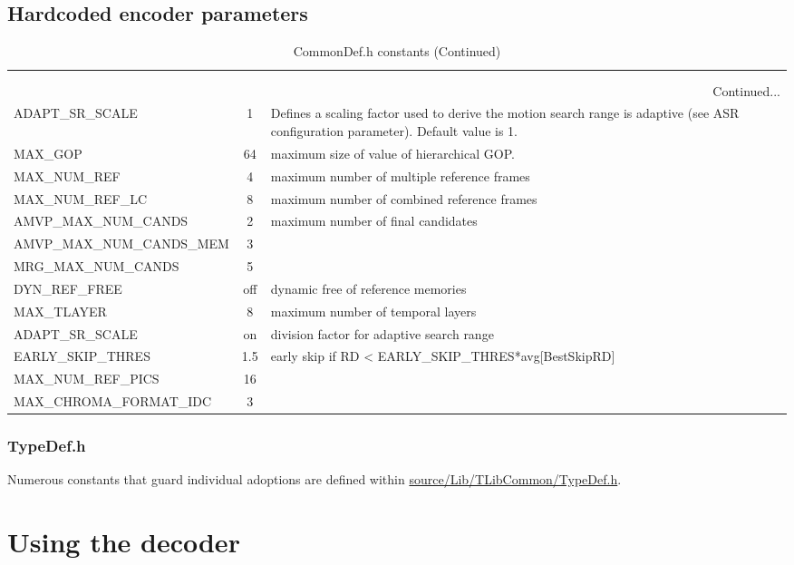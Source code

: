 \documentclass[a4paper,11pt]{jvetdoc}
\newcommand{\clearOptions}{\gdef\optOption{}\gdef\optShortOption{}\gdef\optDefault{}}
\newenvironment{MacroTable}[1]{%
	\scriptsize
	\def\arraystretch{1.3}
	\clearOptions
	\begin{longtable}{lcp{0.5\textwidth}}
	 \caption{#1} \\
	 \hline
	  \thead{Option} &
	  \thead{Default} &
	  \thead{Description} \\
	 \hline
	\endfirsthead
	 \caption[]{#1 (Continued)} \\
	 \hline
	  \thead{Option} &
	  \thead{Default} &
	  \thead{Description} \\
	 \hline
	\endhead
	 \multicolumn{3}{r}{Continued...}\\
	 \hline
	\endfoot
	 \hline
	\endlastfoot
}{%
	\end{longtable}
}
\begin{document}
\subsection{Hardcoded encoder parameters}
\begin{MacroTable}{CommonDef.h constants}
ADAPT_SR_SCALE &
1 &
Defines a scaling factor used to derive the motion search range is
adaptive (see ASR configuration parameter). Default value is 1.
\\

MAX_GOP &
64 &
maximum size of value of hierarchical GOP.
\\

MAX_NUM_REF &
4 &
maximum number of multiple reference frames
\\

MAX_NUM_REF_LC &
8 &
maximum number of combined reference frames
\\

AMVP_MAX_NUM_CANDS &
2 &
maximum number of final candidates
\\

AMVP_MAX_NUM_CANDS_MEM &
3 &
\\

MRG_MAX_NUM_CANDS &
5 &
\\

DYN_REF_FREE &
off &
dynamic free of reference memories
\\

MAX_TLAYER &
8 &
maximum number of temporal layers
\\

ADAPT_SR_SCALE &
on &
division factor for adaptive search range
\\

EARLY_SKIP_THRES &
1.5 &
early skip if RD < EARLY_SKIP_THRES*avg[BestSkipRD]
\\

MAX_NUM_REF_PICS &
16 &
\\

MAX_CHROMA_FORMAT_IDC &
3 &
\\
\end{MacroTable}

\subsubsection*{TypeDef.h}
Numerous constants that guard individual adoptions are defined within
\url{source/Lib/TLibCommon/TypeDef.h}.


\clearpage
\section{Using the decoder}
\end{document}

